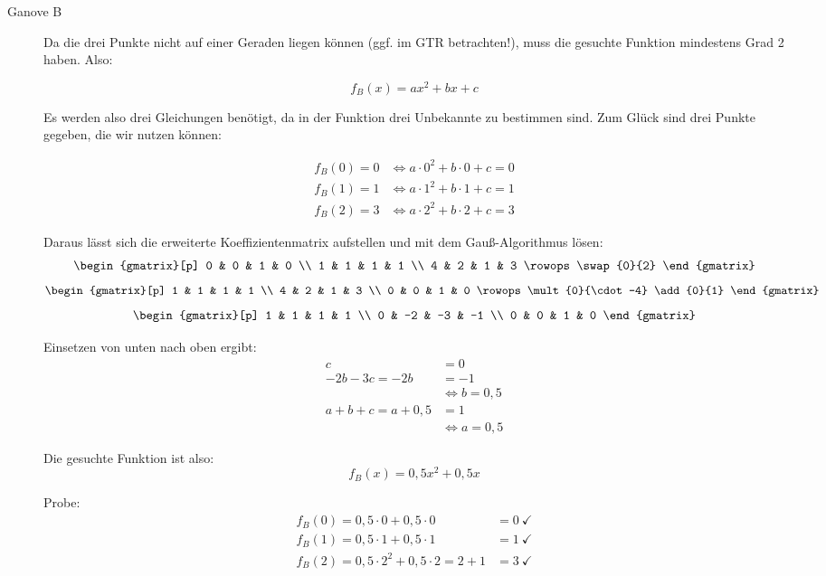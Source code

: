\documentclass[11pt, a4paper,
]{scrartcl}
\begin{document}
\begin{aufgabe}
\begin{loesung}
\begin{description}
				\item[Ganove B]
				Da die drei Punkte nicht auf einer Geraden liegen können (ggf. im GTR betrachten!), muss die gesuchte Funktion mindestens Grad 2 haben. Also:

				\[ f_B(x) = ax^2 + bx + c \]

				Es werden also drei Gleichungen benötigt, da in der Funktion drei Unbekannte zu bestimmen sind. Zum Glück sind drei Punkte gegeben, die wir nutzen können:

				\begin{align*}
					f_B(0) = 0 &\Leftrightarrow a\cdot 0^2 + b\cdot 0 + c = 0 \\
					f_B(1) = 1 &\Leftrightarrow a\cdot 1^2 + b\cdot 1 + c = 1 \\
					f_B(2) = 3 &\Leftrightarrow a\cdot 2^2 + b\cdot 2 + c = 3
				\end{align*}

				Daraus lässt sich die erweiterte Koeffizientenmatrix aufstellen und mit dem Gauß-Algorithmus lösen:
				\[ \begin{gmatrix}[p]
				0 & 0 & 1 & 0 \\
				1 & 1 & 1 & 1 \\
				4 & 2 & 1 & 3
				\rowops
				\swap{0}{2}
				\end{gmatrix} \]
				\[ \begin{gmatrix}[p]
				1 & 1 & 1 & 1 \\
				4 & 2 & 1 & 3 \\
				0 & 0 & 1 & 0
				\rowops
				\mult{0}{\cdot -4}
				\add{0}{1}
				\end{gmatrix} \]
				\[ \begin{gmatrix}[p]
				1 & 1 & 1 & 1 \\
				0 & -2 & -3 & -1 \\
				0 & 0 & 1 & 0
				\end{gmatrix} \]

				Einsetzen von unten nach oben ergibt:
				\begin{align*}
				c &= 0 \\
				-2b - 3c = -2b &= -1 \\
				&\Leftrightarrow b = 0,5 \\
				a + b + c = a + 0,5 &= 1 \\
				&\Leftrightarrow a = 0,5
				\end{align*}

				Die gesuchte Funktion ist also:
				\[ f_B(x) = 0,5x^2 + 0,5x \]

				Probe:
				\begin{align*}
				f_B(0) = 0,5\cdot 0 + 0,5\cdot 0 &= 0 \ \checkmark \\
				f_B(1) = 0,5\cdot 1 + 0,5\cdot 1 &= 1 \ \checkmark \\
				f_B(2) = 0,5\cdot 2^2 + 0,5\cdot 2 = 2 + 1 &= 3 \ \checkmark
				\end{align*}


\end{description}
\end{loesung}
\end{aufgabe}
\end{document}
